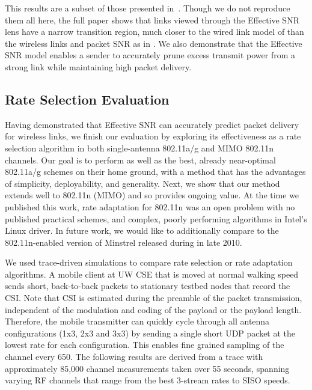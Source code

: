  This results are a subset of those presented in~\cite{halperin_esnr}. Though we do not reproduce them all here, the full paper shows that links viewed through the Effective SNR lens have a narrow transition region, much closer to the wired link model of  than the wireless links and packet SNR as in . We also demonstrate that the Effective SNR model enables a sender to accurately prune excess transmit power from a strong link while maintaining high packet delivery.

\subsection{Rate Selection Evaluation}
Having demonstrated that Effective SNR can accurately predict packet delivery for wireless links, we finish our evaluation by exploring its effectiveness as a rate selection algorithm in both single-antenna 802.11a/g and MIMO 802.11n channels. Our goal is to perform as well as the best, already near-optimal 802.11a/g schemes on their home ground, with a method that has the advantages of simplicity, deployability, and generality. Next, we show that our method extends well to 802.11n (MIMO) and so provides ongoing value. At the time we published this work, rate adaptation for 802.11n was an open problem with no published practical schemes, and complex, poorly performing algorithms in Intel's  Linux driver. In future work, we would like to additionally compare to the 802.11n-enabled version of Minstrel released during in late 2010.

 We used trace-driven simulations to compare rate selection or rate adaptation algorithms. A mobile client at UW CSE that is moved at normal walking speed sends short, back-to-back packets to stationary testbed nodes that record the CSI\@. Note that CSI is estimated during the preamble of the packet transmission, independent of the modulation and coding of the payload or the payload length. Therefore, the mobile transmitter can quickly cycle through all antenna configurations (1x3, 2x3 and 3x3) by sending a single short UDP packet at the lowest rate for each configuration. This enables fine grained sampling of the channel every 650\us. The following results are derived from a trace with approximately 85,000 channel measurements taken over 55 seconds, spanning varying RF channels that range from the best 3-stream rates to SISO speeds.

